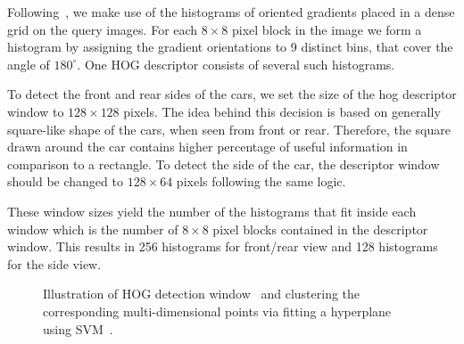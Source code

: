 Following~\citet{dalal2005}, we make use of the histograms of oriented
gradients placed in a dense grid on the query images. For each $8 \times 8$
pixel block in the image we form a histogram by assigning the gradient
orientations to 9 distinct bins, that cover the angle of $180^{\circ}$. One
HOG descriptor consists of several such histograms.

To detect the front and rear sides of the cars, we set the size of the hog
descriptor window to $128 \times 128$ pixels. The idea behind this decision is
based on generally square-like shape of the cars, when seen from front or
rear. Therefore, the square drawn around the car contains higher percentage of
useful information in comparison to a rectangle. To detect the side of the
car, the descriptor window should be changed to $128 \times 64$ pixels
following the same logic.

These window sizes yield the number of the histograms that fit inside each
window which is the number of $8 \times 8$ pixel blocks contained in the
descriptor window. This results in 256 histograms for front/rear view and 128
histograms for the side view.

\begin{figure}[t]%
\centering
{}
\caption{Illustration of HOG detection window~ and clustering the corresponding multi-dimensional points via fitting a hyperplane  using SVM~.}
\label{fig:det_to_svm}
\end{figure}

